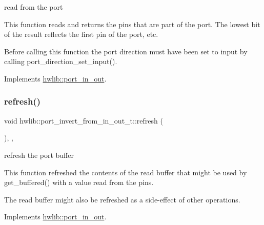 read from the port

This function reads and returns the pins that are part of the port. The lowest bit of the result reflects the first pin of the port, etc.

Before calling this function the port direction must have been set to input by calling port\+\_\+direction\+\_\+set\+\_\+input(). 

Implements \hyperlink{classhwlib_1_1port__in__out_a5f6662d6fccd2b256d20722a4f3e5840}{hwlib\+::port\+\_\+in\+\_\+out}.

\mbox{\label{classhwlib_1_1port__invert__from__in__out__t_ace7b8002a7aa10de1a22634c04751123}} 
\subsubsection{\texorpdfstring{refresh()}{refresh()}}
{\footnotesize\ttfamily void hwlib\+::port\+\_\+invert\+\_\+from\+\_\+in\+\_\+out\+\_\+t\+::refresh (\begin{DoxyParamCaption}{ }\end{DoxyParamCaption})\hspace{0.3cm}{\ttfamily [inline]}, {\ttfamily [override]}, {\ttfamily [virtual]}}

refresh the port buffer

This function refreshed the contents of the read buffer that might be used by get\+\_\+buffered() with a value read from the pins.

The read buffer might also be refreshed as a side-\/effect of other operations. 

Implements \hyperlink{classhwlib_1_1port__in__out_afa3680e36a05dd3f5a0eac1b63aac37c}{hwlib\+::port\+\_\+in\+\_\+out}.

\mbox{\label{classhwlib_1_1port__invert__from__in__out__t_add95d20973a18e012ff97988e49aeff4}} 
